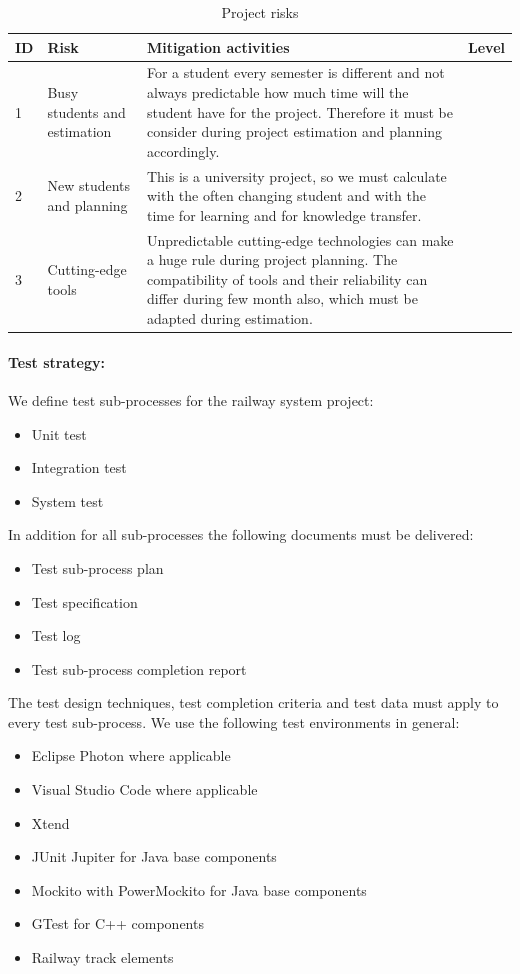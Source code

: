 \begin{table}[H]
	\caption{Project risks}
	\label{table:project-risks}
	\begin{center}
		\renewcommand{\arraystretch}{1.8}
		\begin{tabu} 
			to 0.9 \textwidth
			{ X[0.1, c] X[l] X[l] X[0.2, l] }
			\toprule
			ID & Risk & Mitigation activities & Level \\  & Busy students and estimation & For a student every semester is different and not always predictable how much time will the student have for the project. Therefore it must be consider during project estimation and planning accordingly.     &  \\ 
			2 & New students and planning & This is a university project, so we must calculate with the often changing student and with the time for learning and for knowledge transfer.& \\
			3 & Cutting-edge tools & Unpredictable cutting-edge technologies can make a huge rule during project planning. The compatibility of tools and their reliability can differ during few month also, which must be adapted during estimation. & \\ \bottomrule
		\end{tabu}
	\end{center}
\end{table}


\paragraph{Test strategy:} 
We define test sub-processes for the railway system project:
\begin{itemize}
	\item Unit test
	\item Integration test
	\item System test
\end{itemize}
In addition for all sub-processes the following documents must be delivered:
\begin{itemize}
	\item Test sub-process plan
	\item Test specification
	\item Test log
	\item Test sub-process completion report
\end{itemize}
The test design techniques, test completion criteria and test data must apply to every test sub-process. We use the following test environments in general:
\begin{itemize}
	\item Eclipse Photon where applicable
	\item Visual Studio Code where applicable
	\item Xtend 
	\item JUnit Jupiter for Java base components
	\item Mockito with PowerMockito for Java base components
	\item GTest for C++ components
	\item Railway track elements
\end{itemize}
